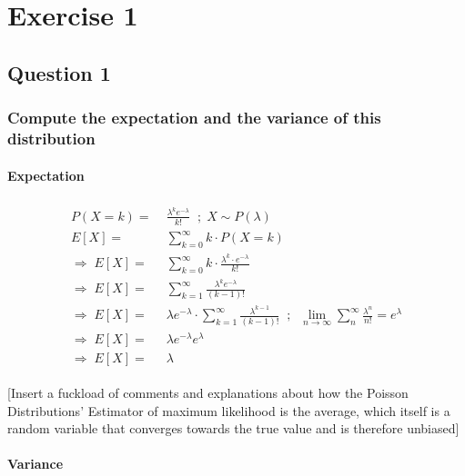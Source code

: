 
\chapter{Exercise 1}

\section{Question 1}

\subsection{Compute the expectation and the variance of this distribution}
\subsubsection{Expectation}

\begin{align}
    \begin{split}
        P(X=k) =& \; \frac{\lambda^k e^{-\lambda}}{k!} \;\; ; \; X \sim P(\lambda) \\
        E[X] =& \; \sum_{k=0}^{\infty} k \cdot P(X=k) \\
        \Rightarrow \; E[X] =& \; \sum_{k=0}^{\infty} k \cdot \frac{\lambda^k \cdot e^{-\lambda}}{k!} \\
        \Rightarrow \; E[X] =& \; \sum_{k=1}^{\infty} \frac{\lambda^{k} e^{-\lambda}}{(k-1)!} \\
        \Rightarrow \; E[X] =& \; \lambda e^{-\lambda} \cdot \sum_{k=1}^{\infty} \frac{\lambda^{k-1}}{(k-1)!} \;\; ; \;\; \lim_{n \to \infty} \sum_{n}^{\infty} \frac{\lambda^n}{n!} = e^{\lambda} \\
        \Rightarrow \; E[X] =& \; \lambda e^{-\lambda} e^{\lambda} \\
        \Rightarrow \; E[X] =& \; \lambda
    \end{split}
\end{align}

[Insert a fuckload of comments and explanations about how the Poisson Distributions' Estimator of maximum likelihood is the average, which itself is a random variable that converges towards the true value and is therefore unbiased]

\subsubsection{Variance}

